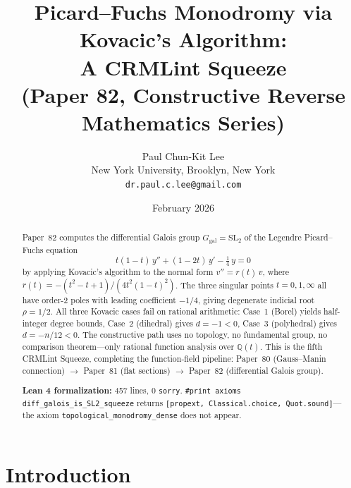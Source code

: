 \documentclass[11pt]{article}
\theoremstyle{plain}
\theoremstyle{definition}
\theoremstyle{remark}
\newcommand{\Q}{\mathbb{Q}}
\newcommand{\SL}{\mathrm{SL}}
\newcommand{\Ggal}{G_{\mathrm{gal}}}
\begin{document}

\title{Picard--Fuchs Monodromy via Kovacic's Algorithm:\\
A CRMLint Squeeze\\[6pt]
{\large (Paper 82, Constructive Reverse Mathematics Series)}}

\author{Paul Chun-Kit Lee\\
\small New York University, Brooklyn, New York\\
\small \texttt{dr.paul.c.lee@gmail.com}}

\date{February 2026}

\maketitle

\begin{abstract}
Paper~82 computes the differential Galois group $\Ggal = \SL_2$ of the Legendre Picard--Fuchs equation
\[
  t(1-t)\,y'' + (1-2t)\,y' - \tfrac{1}{4}\,y = 0
\]
by applying Kovacic's algorithm to the normal form $v'' = r(t)\,v$, where $r(t) = -(t^2 - t + 1)/(4t^2(1-t)^2)$.
The three singular points $t = 0, 1, \infty$ all have order-2 poles with leading coefficient $-1/4$, giving degenerate indicial root $\rho = 1/2$.
All three Kovacic cases fail on rational arithmetic: Case~1 (Borel) yields half-integer degree bounds, Case~2 (dihedral) gives $d = -1 < 0$, Case~3 (polyhedral) gives $d = -n/12 < 0$.
The constructive path uses no topology, no fundamental group, no comparison theorem---only rational function analysis over $\Q(t)$.
This is the fifth CRMLint Squeeze, completing the function-field pipeline:
Paper~80 (Gauss--Manin connection) $\to$ Paper~81 (flat sections) $\to$ Paper~82 (differential Galois group).

\medskip\noindent
\textbf{Lean 4 formalization:} 457 lines, 0 \texttt{sorry}.
\texttt{\#print axioms diff\_galois\_is\_SL2\_squeeze} returns \texttt{[propext, Classical.choice, Quot.sound]}---the axiom \texttt{topological\_monodromy\_dense} does not appear.
\end{abstract}

\section{Introduction}
\label{sec:intro}
\end{document}
